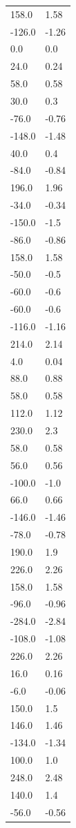 \begin{longtable}{ll}
158.0 & 1.58 \\
-126.0 & -1.26 \\
0.0 & 0.0 \\
24.0 & 0.24 \\
58.0 & 0.58 \\
30.0 & 0.3 \\
-76.0 & -0.76 \\
-148.0 & -1.48 \\
40.0 & 0.4 \\
-84.0 & -0.84 \\
196.0 & 1.96 \\
-34.0 & -0.34 \\
-150.0 & -1.5 \\
-86.0 & -0.86 \\
158.0 & 1.58 \\
-50.0 & -0.5 \\
-60.0 & -0.6 \\
-60.0 & -0.6 \\
-116.0 & -1.16 \\
214.0 & 2.14 \\
4.0 & 0.04 \\
88.0 & 0.88 \\
58.0 & 0.58 \\
112.0 & 1.12 \\
230.0 & 2.3 \\
58.0 & 0.58 \\
56.0 & 0.56 \\
-100.0 & -1.0 \\
66.0 & 0.66 \\
-146.0 & -1.46 \\
-78.0 & -0.78 \\
190.0 & 1.9 \\
226.0 & 2.26 \\
158.0 & 1.58 \\
-96.0 & -0.96 \\
-284.0 & -2.84 \\
-108.0 & -1.08 \\
226.0 & 2.26 \\
16.0 & 0.16 \\
-6.0 & -0.06 \\
150.0 & 1.5 \\
146.0 & 1.46 \\
-134.0 & -1.34 \\
100.0 & 1.0 \\
248.0 & 2.48 \\
140.0 & 1.4 \\
-56.0 & -0.56 \\

\end{longtable}
